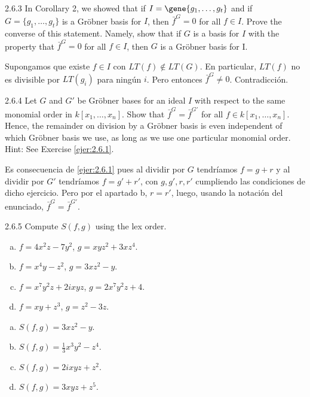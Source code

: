 \documentclass[twoside]{article}
\begin{document}
\begin{ejercicio}{2.6.3}
In Corollary 2, we showed that if $I =\gene{ 
g_1,\dots , g_t}$ and if $G = \{g_1,\dots , g_t\}$ is a Gröbner
basis for $I$, then $\bar{f}^G = 0$ for all $f ∈ I$. Prove the converse of this statement. Namely, show
that if $G$ is a basis for $I$ with the property that $\bar{f}^G = 0$ for all $f ∈ I$, then $G$ is a Gröbner
basis for I.

\end{ejercicio}
\begin{solucion}
Supongamos que existe $f\in I$ con $LT(f)\notin LT(G)$. En particular, $LT(f)$ no es divisible por $LT(g_i)$ para ningún $i$. Pero entonces $\bar{f}^G \neq 0$. Contradicción.
\end{solucion}

\newpage

\begin{ejercicio}{2.6.4}
Let $G$ and $G'$ be Gröbner bases for an ideal $I$ with respect to the same monomial order
in $k[x_1,\dots , x_n]$. Show that $\bar{f}^G = \bar{f}^{G'}$
for all $f ∈ k[x_1,\dots , x_n]$. Hence, the remainder on
division by a Gröbner basis is even independent of which Gröbner basis we use, as long
as we use one particular monomial order. Hint: See Exercise \ref{ejer:2.6.1}.
\end{ejercicio}
\begin{solucion}
Es consecuencia de \ref{ejer:2.6.1} pues al dividir por $G$ tendríamos $f=g+r$ y al dividir por $G'$ tendríamos $f=g'+r'$, con $g,g',r,r'$ cumpliendo las condiciones de dicho ejercicio. Pero por el apartado b, $r=r'$, luego, usando la notación del enunciado, $\bar{f}^G = \bar{f}^{G'}$.
\end{solucion}
\newpage

\begin{ejercicio}{2.6.5}
Compute $S( f , g)$ using the lex order.
\begin{enumerate}[a.]
\item $f = 4x^2z − 7y^2$, $g = xyz^2 + 3xz^4$.
\item $f = x^4y − z^2$, $g = 3xz^2 − y$.
\item $f = x^7y^2z + 2ixyz$, $g = 2x^7y^2z + 4$.
\item $f = xy + z^3$, $g = z^2 − 3z$.
\end{enumerate}
\end{ejercicio}
\begin{solucion}

\begin{enumerate}[a.]
\item $S(f,g)=3xz^2-y.$
\item $S(f,g)=\frac{1}{3}x^3y^2 - z^4.$
\item $S(f,g)=2ixyz+z^2.$
\item $S(f,g)=3xyz+z^5.$
\end{enumerate}
\end{solucion}
\end{document}
